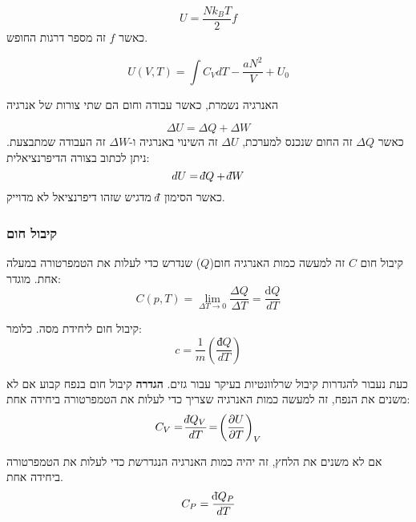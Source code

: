 \documentclass{tstextbook}
\begin{document}
\begin{proposition}
$$U={\frac{N k_{B}T}{2}}f$$
כאשר \(f\) זה מספר דרגות החופש.

\end{proposition}
\begin{proposition}
$$U(V,T)=\int C_{V}d T-{\frac{a N^{2}}{V}}+U_{0}$$

\end{proposition}
\begin{theorem}
האנרגיה נשמרת, כאשר עבודה וחום הם שתי צורות של אנרגיה

\end{theorem}
\begin{corollary}
$$\Delta U=\Delta Q+\Delta W$$
כאשר \(\Delta Q\) זה החום שנכנס למערכת, \(\Delta U\) זה השינוי באנרגיה ו-\(\Delta W\) זה העבודה שמתבצעת. ניתן לכתוב בצורה הדיפרנציאלית:
$$dU=\;\bar{}\mkern-7.5mu dQ+\;\bar{}\mkern-7.5mu dW$$
כאשר הסימון \(\;\bar{}\mkern-7.5mu d\) מדגיש שזהו דיפרנציאל לא מדוייק.

\end{corollary}
\subsubsection{קיבול חום}

\begin{definition}
קיבול חום \(C\) זה למעשה כמות האנרגיה חום(\(Q\)) שנדרש כדי לעלות את הטמפרטורה במעלה אחת. מוגדר:
$$C(p,T)=\operatorname*{lim}_{\Delta T\rightarrow0}\frac{\Delta Q}{\Delta T}=\frac{\mathrm{d}Q}{d T}$$

\end{definition}
\begin{definition}
קיבול חום ליחידת מסה. כלומר:
$$c=\frac{1}{m}\left( \frac{ đ Q}{d T} \right)$$

\end{definition}
כעת נעבור להגדרות קיבול שרלוונטיות בעיקר עבור גזים.
\textbf{הגדרה} קיבול חום בנפח קבוע
אם לא משנים את הנפח, זה למעשה כמות האנרגיה שצריך כדי לעלות את הטמפרטורה ביחידה אחת:
$$C_{V}=\!\frac{\;\bar{}\mkern-7.5mu dQ_{V}}{d T}\!=\!\left(\frac{\partial U}{\partial T}\right)_{V}$$

\begin{definition}
אם לא משנים את הלחץ, זה יהיה כמות האנרגיה הנגדרשת כדי לעלות את הטמפרטורה ביחידה אחת.
$$C_{P}={\frac{\mathrm{\;\bar{}\mkern-7.5mu d}Q_{P}}{d T}}$$

\end{definition}
\end{document}
